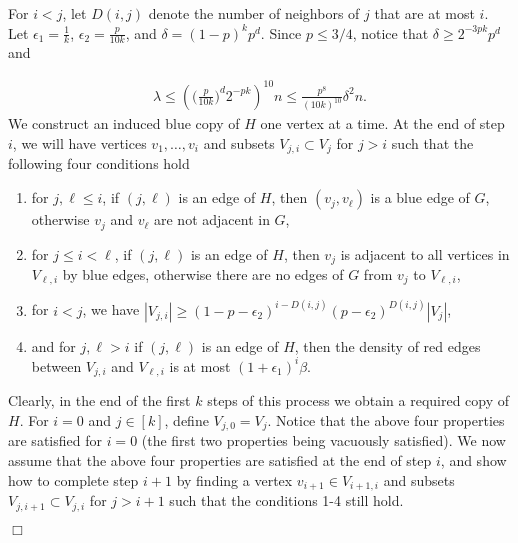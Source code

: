 \documentclass[11pt]{article}
\newenvironment{proof}
      {\medskip\noindent{\bf Proof.}\hspace{1mm}}
      {\hfill$\Box$\medskip}
\begin{document}
\begin{proof}
For $i<j$, let $D(i,j)$ denote the number of neighbors of $j$ that are at most $i$. Let $\epsilon_1=\frac{1}{k}$,
$\epsilon_2=\frac{p}{10k}$, and $\delta=(1-p)^kp^d$. Since $p \leq 3/4$, notice that $\delta
\geq 2^{-3pk}p^d$  and

\begin{eqnarray}
\label{eq2}
\lambda \leq \left(\Big(\frac{p}{10k}\Big)^d2^{-pk}\right)^{10}n \leq \frac{p^8}{(10k)^{10}}\delta^2n.
\end{eqnarray}
We construct an induced blue
copy of $H$ one vertex at a time. At the end of step $i$, we will have vertices
$v_1,\ldots,v_i$ and subsets $V_{j,i} \subset V_j$ for $j >i $ such that the following four conditions hold
\begin{enumerate}
\item  for $j, \ell \leq i$, if $(j,{\ell})$ is an
edge of $H$, then $(v_j,v_{\ell})$ is a blue edge of $G$, otherwise
$v_j$ and $v_{\ell}$  are not adjacent in $G$,
\item for $ j \leq i < \ell$, if $(j,{\ell})$ is an
edge of $H$, then $v_j$ is adjacent to all vertices in $V_{\ell,i}$
by blue edges, otherwise there are no edges of $G$ from $v_j$ to
$V_{\ell,i}$,
\item for $i < j$, we have $|V_{j,i}| \geq (1-p-\epsilon_2)^{i-D(i,j)}(p-\epsilon_2)^{D(i,j)}|V_j|$,
\item and for $j, \ell>i$ if $(j,\ell)$ is an edge of $H$, then the density of red edges between $V_{j,i}$ and $V_{\ell,i}$ is
at most $(1+\epsilon_1)^i \beta$.
\end{enumerate}

Clearly, in the end of the first $k$ steps of this process we obtain a
required copy of $H$. For $i=0$ and $j \in [k]$, define
$V_{j,0}=V_j$. Notice that the above four properties are satisfied
for $i=0$ (the first two properties being vacuously satisfied). We
now assume that the above four properties are satisfied at the end
of step $i$, and show how to complete step $i+1$ by finding a vertex
$v_{i+1} \in V_{i+1,i}$ and subsets $V_{j,i+1} \subset V_{j,i}$ for $j>i+1$ such
that the conditions 1-4 still hold.


\end{proof}
\end{document}
